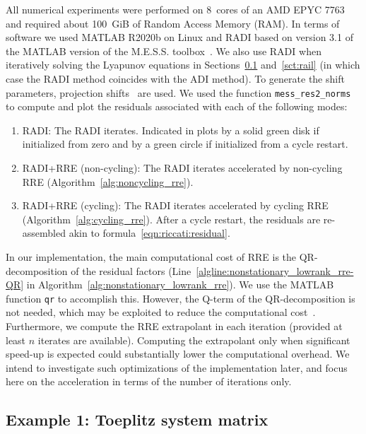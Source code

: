 All numerical experiments were performed on 8~cores of an AMD EPYC 7763 and required about 100~GiB of Random Access Memory (RAM). %
In terms of software we used MATLAB R2020b on Linux and RADI based on version 3.1 of the MATLAB version of the M.E.S.S. toolbox~\cite{SaaKB-mmess-all-versions}.
We also use RADI when iteratively solving the Lyapunov equations in Sections~\ref{sct:toeplitz} and~\ref{sct:rail} (in which case the RADI method coincides with the ADI method).
To generate the shift parameters, projection shifts~\cite{benner2014self} are used.
We used the function \texttt{mess\_res2\_norms} to compute and plot the residuals associated with each of the following modes:
\begin{enumerate}
	\item RADI\@: The RADI iterates. Indicated in plots by a solid green disk if initialized from zero and by a green circle if initialized from a cycle restart.
	\item RADI+RRE (non-cycling): The RADI iterates accelerated by non-cycling \ac{RRE} (Algorithm~\ref{alg:noncycling_rre}).
	\item RADI+RRE (cycling): The RADI iterates accelerated by cycling \ac{RRE} (Algorithm~\ref{alg:cycling_rre}).
		After a cycle restart, the residuals are re-assembled akin to formula~\eqref{eqn:riccati:residual}.
\end{enumerate}

In our implementation, the main computational cost of \ac{RRE} is the QR-decomposition of the residual factors (Line~\ref{algline:nonstationary_lowrank_rre-QR} in Algorithm~\ref{alg:nonstationary_lowrank_rre}).
We use the MATLAB function \texttt{qr} to accomplish this.
However, the Q-term of the QR-decomposition is not needed, which may be exploited to reduce the computational cost~\cite{BenLP08}.
Furthermore, we compute the \ac{RRE} extrapolant in each iteration (provided at least $n$ iterates are available).
Computing the extrapolant only when significant speed-up is expected could substantially lower the computational overhead.
We intend to investigate such optimizations of the implementation later, and focus here on the acceleration in terms of the number of iterations only.


\subsection{Example 1: Toeplitz system matrix}\label{sct:toeplitz}
